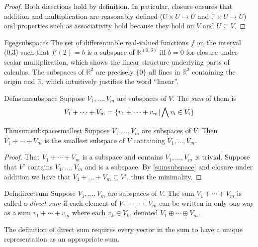 \begin{proof}
  Both directions hold by definition. In paticular, closure ensures that addition and multiplication are reasonably defined ($U\times U\to U$ and $\mathbb F\times U\to U$) and properties such as associativity hold because they hold on $V$ and $U\subseteq V$.
\end{proof}

\begin{reference}{Eg}{egsubspaces}
  The set of differentiable real-valued functions $f$ on the interval (0,3) such that $f'(2)=b$ is a subspace of $\mathbb R^{(0,3)}$ iff $b=0$ for closure under scalar multiplication, which shows the linear structure underlying parts of calculus. The subspaces of $\mathbb R^2$ are precisely $\{0\}$ all lines in $\mathbb R^2$ containing the origin and $\mathbb R$, which intuitively justifies the word ``linear''.
\end{reference}


\begin{reference}{Defn}{sumsubspace}
  Suppose $V_1,\dots,V_m$ are subspaces of $V$. The \textit{sum} of them is
  \[
    V_1+\cdots+V_m=\{v_1+\cdots+v_m|\bigwedge v_i\in V_i\}\qedhere
  \]
\end{reference}

\begin{reference}{Thm}{sumsubspacesmallest}
  Suppose $V_1,\dots,V_m$ are subspaces of $V$. Then $V_1+\cdots+V_m$ is the smallest subspace of $V$ containing $V_1,\dots,V_m$.
\end{reference}

\begin{proof}
  That $V_1+\cdots+V_m$ is a subspace and contains $V_1,\dots,V_m$ is trivial. Suppose that $V'$ contains $V_1,\dots,V_m$ and is a subspace. By \ref{sumsubspace} and closure under addition we have that $V_1+\dots+V_m\subseteq V'$, thus the minimality.
\end{proof}

\begin{reference}{Defn}{directsum}
  Suppose $V_1,\dots,V_m$ are subspaces of $V$. The sum $V_1+\cdots+V_m$ is called a \textit{direct sum} if each element of $V_1+\cdots+V_m$ can be written in only one way as a sum $v_1+\cdots+v_m$ where each $v_k\in V_k$, denoted $V_1\oplus\cdots\oplus V_m$.
\end{reference}

The definition of direct sum requires every vector in the sum to have a unique representation as an appropriate sum.

